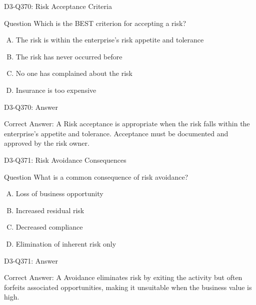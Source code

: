 \documentclass{beamer}
\begin{document}
\begin{frame}{D3-Q370: Risk Acceptance Criteria}
	\begin{block}{Question}
		Which is the BEST criterion for accepting a risk?
	\end{block}
	\begin{enumerate}[(A)]
		\item The risk is within the enterprise's risk appetite and tolerance
		\item The risk has never occurred before
		\item No one has complained about the risk
		\item Insurance is too expensive
	\end{enumerate}
\end{frame}
\begin{frame}{D3-Q370: Answer}
	\begin{block}{Correct Answer: A}
		Risk acceptance is appropriate when the risk falls within the enterprise's appetite and tolerance. Acceptance must be documented and approved by the risk owner.
	\end{block}
\end{frame}

\begin{frame}{D3-Q371: Risk Avoidance Consequences}
	\begin{block}{Question}
		What is a common consequence of risk avoidance?
	\end{block}
	\begin{enumerate}[(A)]
		\item Loss of business opportunity
		\item Increased residual risk
		\item Decreased compliance
		\item Elimination of inherent risk only
	\end{enumerate}
\end{frame}
\begin{frame}{D3-Q371: Answer}
	\begin{block}{Correct Answer: A}
		Avoidance eliminates risk by exiting the activity but often forfeits associated opportunities, making it unsuitable when the business value is high.
	\end{block}
\end{frame}
\end{document}
